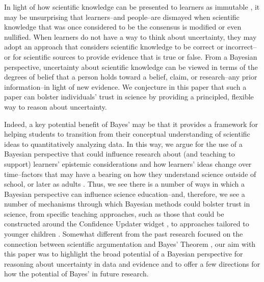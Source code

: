 \documentclass[man, floatsintext]{apa7} %
\begin{document}
In light of how scientific knowledge can be presented to learners as immutable \parencite{d90, manz2018supporting, carey1993understanding}, it may be unsurprising that learners--and people--are dismayed when scientific knowledge that was once considered to be the consensus is modified or even nullified. When learners do not have a way to think about uncertainty, they may adopt an approach that considers scientific knowledge to be correct or incorrect--or for scientific sources to provide evidence that is true or false. From a Bayesian perspective, uncertainty about scientific knowledge can be viewed in terms of the degrees of belief that a person holds toward a belief, claim, or research--any prior information--in light of new evidence. We conjecture in this paper that such a paper can bolster individuals' trust in science by providing a principled, flexible way to reason about uncertainty.

Indeed, a key potential benefit of Bayes' may be that it provides a framework for helping students to transition from their conceptual understanding of scientific ideas to quantitatively analyzing data. In this way, we argue for the use of a Bayesian perspective that could influence research about (and teaching to support) learners' epistemic considerations and how learners' ideas change over time--factors that may have a bearing on how they understand science outside of school, or later as adults \parencite{sinatra2014addressing}. Thus, we see there is a number of ways in which a Bayesian perspective can influence science education--and, therefore, we see  a number of mechanisms through which Bayesian methods could bolster trust in science, from specific teaching approaches, such as those that could be constructed around the Confidence Updater widget \parencite[]{warren_impact_2020, warren_quantitative_2018}, to approaches tailored to younger children \parencite[e.g., ]{kazak2015bayesian, kazak2018emergent}. Somewhat different from the past research focused on the connection between scientific argumentation and Bayes' Theorem \parencite[]{n11, so12}, our aim with this paper was to highlight the broad potential of a Bayesian perspective for reasoning about uncertainty in data and evidence and to offer a few directions for how the potential of Bayes' in future research. \\
\end{document}
